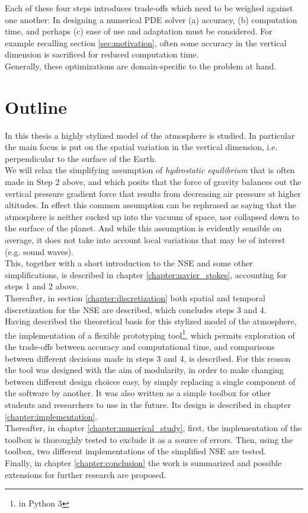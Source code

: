 Each of these four steps introduces trade-offs which need to be weighed against one another:
In designing a numerical PDE solver (a) accuracy, (b) computation time, and perhaps (c) ease of use and adaptation must be considered.
For example recalling section \ref{sec:motivation}, often some accuracy in the vertical dimension is sacrificed for reduced computation time.\\
Generally, these optimizations are domain-specific to the problem at hand.

\section{Outline}
In this thesis a highly stylized model of the atmosphere is studied.
In particular the main focus is put on the spatial variation in the vertical dimension, i.e. perpendicular to the surface of the Earth.\\
We will relax the simplifying assumption of \emph{hydrostatic equilibrium} that is often made in Step 2 above, and which posits that the force of gravity balances out the vertical pressure gradient force that results from decreasing air pressure at higher altitudes\cite{coiffier2011fundamentals}.
In effect this common assumption can be rephrased as saying that the atmosphere is neither sucked up into the vacuum of space, nor collapsed down to the surface of the planet.
And while this assumption is evidently sensible on average, it does not take into account local variations that may be of interest (e.g. sound waves).\\
This, together with a short introduction to the NSE and some other simplifications, is described in chapter \ref{chapter:navier_stokes}, accounting for steps 1 and 2 above.\\
Thereafter, in section \ref{chapter:discretization} both spatial and temporal discretization for the NSE are described, which concludes steps 3 and 4.\\
Having described the theoretical basis for this stylized model of the atmosphere, the implementation of a flexible prototyping tool\footnote{in Python 3}, which permits exploration of the trade-offs between accuracy and computational time, and comparisons between different decisions made in steps 3 and 4, is described.
For this reason the tool was designed with the aim of modularity, in order to make changing between different design choices easy, by simply replacing a single component of the software by another.
It was also written as a simple toolbox for other students and researchers to use in the future.
Its design is described in chapter \ref{chapter:implementation}.\\
Thereafter, in chapter \ref{chapter:numerical_study}, first, the implementation of the toolbox is thoroughly tested to exclude it as a source of errors.
Then, using the toolbox, two different implementations of the simplified NSE are tested.\\
Finally, in chapter \ref{chapter:conclusion} the work is summarized and possible extensions for further research are proposed.


